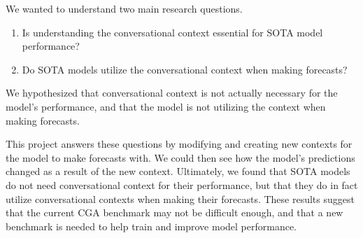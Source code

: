 We wanted to understand two main research questions.
\begin{enumerate}
    \item Is understanding the conversational context essential for SOTA model performance?
    \item Do SOTA models utilize the conversational context when making forecasts?
\end{enumerate}
We hypothesized that conversational context is not actually necessary for the model's performance, and that the model is not utilizing the context when making forecasts. 

This project answers these questions by modifying and creating new contexts for the model to make forecasts with. 
We could then see how the model's predictions changed as a result of the new context. 
Ultimately, we found that SOTA models do not need conversational context for their performance, but that they do in fact utilize conversational contexts when making their forecasts. 
These results suggest that the current CGA benchmark may not be difficult enough, and that a new benchmark is needed to help train and improve model performance. 

